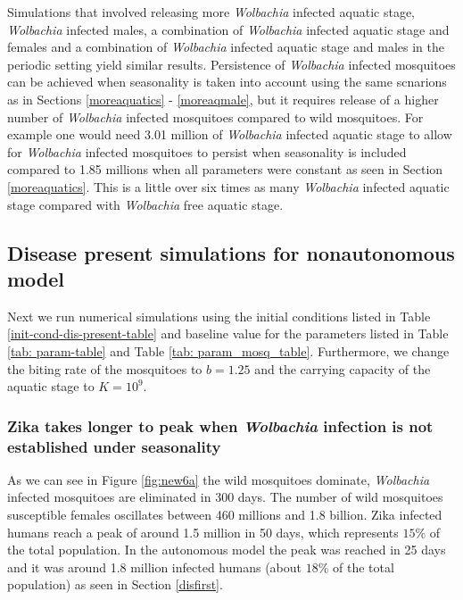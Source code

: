 \documentclass{ws-rv9x6}
\begin{document}

Simulations that involved releasing more \textit{Wolbachia} infected aquatic stage,  \textit{Wolbachia} infected males, a combination of \textit{Wolbachia} infected aquatic stage and females and a combination of \textit{Wolbachia} infected aquatic stage and males in the periodic setting yield similar results. Persistence of \textit{Wolbachia} infected mosquitoes can be achieved when seasonality is taken into account using the same scnarions as in Sections \ref{moreaquatics} - \ref{moreaqmale}, but it requires release of a higher number of \textit{Wolbachia} infected mosquitoes compared to wild mosquitoes. For example one would need 3.01 million of \textit{Wolbachia} infected aquatic stage to allow for \textit{Wolbachia} infected mosquitoes to persist when seasonality is included compared to 1.85 millions when all parameters were constant as seen in Section \ref{moreaquatics}. This is a little over six times as many \textit{Wolbachia} infected aquatic stage compared with \textit{Wolbachia} free aquatic stage. 
\\
\subsection{Disease present simulations for nonautonomous model}
Next we run numerical simulations using the initial conditions listed in Table \ref{init-cond-dis-present-table} and baseline value for the parameters listed in Table \ref{tab: param-table} and Table \ref{tab: param_mosq_table}. Furthermore, we change the biting rate of the mosquitoes to $b=1.25$ and the carrying capacity of the aquatic stage to $K=10^9$. 

\subsubsection{Zika takes longer to peak when \textit{Wolbachia} infection is not established under seasonality}
As we can see in Figure \ref{fig:new6a} the wild mosquitoes dominate, \textit{Wolbachia} infected mosquitoes are eliminated in 300 days. The number of wild mosquitoes susceptible females oscillates between 460 millions and 1.8 billion. Zika infected humans reach a peak of around 1.5 million in 50 days, which represents $15\%$ of the total population. In the autonomous model the peak was reached in 25 days and it was around 1.8 million infected humans (about $18\%$ of the total population) as seen in Section \ref{disfirst}.
\end{document}
